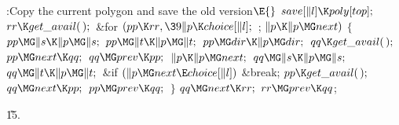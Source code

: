 \Y\B\4:Copy the current polygon and save the old version\X${}\E{}$\6
$\\{save}[\|l]\K\\{poly}[\\{top}];{}$\6
${}\\{rr}\K\\{get\_avail}(\,);{}$\6
\&{for} ${}(\\{pp}\K\\{rr},\39\|p\K\\{choice}[\|l];{}$  ; ${}\|p\K\|p\MG%
\\{next}){}$\5
${}\{{}$\1\6
${}\\{pp}\MG\|s\K\|p\MG\|s;{}$\6
${}\\{pp}\MG\|t\K\|p\MG\|t;{}$\6
${}\\{pp}\MG\\{dir}\K\|p\MG\\{dir};{}$\6
${}\\{qq}\K\\{get\_avail}(\,);{}$\6
${}\\{pp}\MG\\{next}\K\\{qq};{}$\6
${}\\{qq}\MG\\{prev}\K\\{pp};{}$\6
${}\|p\K\|p\MG\\{next};{}$\6
${}\\{qq}\MG\|s\K\|p\MG\|s;{}$\6
${}\\{qq}\MG\|t\K\|p\MG\|t;{}$\6
\&{if} ${}(\|p\MG\\{next}\E\\{choice}[\|l]){}$\1\5
\&{break};\2\6
${}\\{pp}\K\\{get\_avail}(\,);{}$\6
${}\\{qq}\MG\\{next}\K\\{pp};{}$\6
${}\\{pp}\MG\\{prev}\K\\{qq};{}$\6
\4${}\}{}$\2\6
${}\\{qq}\MG\\{next}\K\\{rr};{}$\6
${}\\{rr}\MG\\{prev}\K\\{qq}{}$;\par
\U15.\fi

